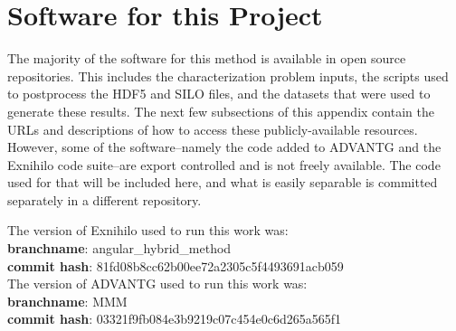 \chapter{Software for this Project}
\label{ch:codes}


The majority of the software for this method is available in open source
repositories. This includes the characterization problem inputs, the scripts
used to postprocess the HDF5 and SILO files, and the datasets that were used to
generate these results. The next few subsections of this appendix contain the
URLs and descriptions of how to access these publicly-available resources.
However, some of the software--namely the code added to
ADVANTG and the Exnihilo code suite--are export controlled and is not freely
available. The code used for that will be included here, and what is easily
separable is committed separately in a different repository.

The version of Exnihilo used to run this work was:\\
\textbf{branchname}: angular\_hybrid\_method \\
\textbf{commit hash}: 81fd08b8cc62b00ee72a2305c5f4493691acb059 \\

The version of ADVANTG used to run this work was:\\
\textbf{branchname}: MMM \\
\textbf{commit hash}: 03321f9fb084e3b9219c07c454e0c6d265a565f1 \\





